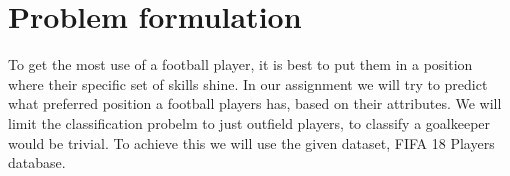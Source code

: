\section{Problem formulation}

To get the most use of a football player, it is best to put them in a position where their specific set of skills shine. In our assignment we will try to predict what preferred position a football players has, based on their attributes. We will limit the classification probelm to just outfield players, to classify a goalkeeper would be trivial. To achieve this we will use the given dataset, FIFA 18 Players database. 
